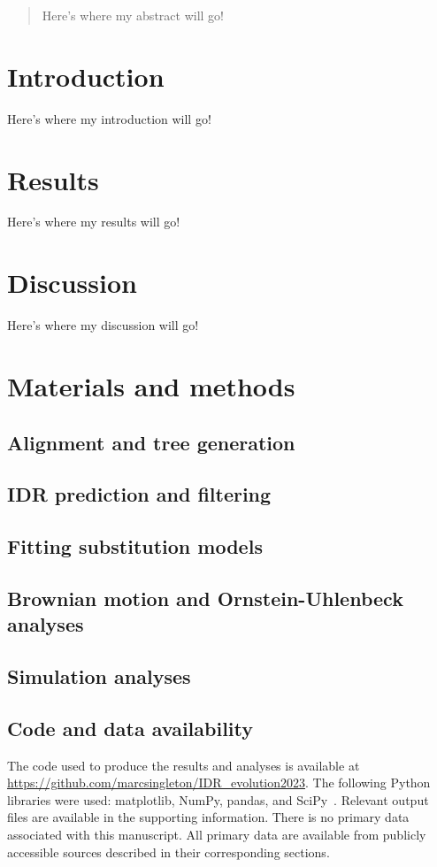 \begin{abstract}
\noindent
Here's where my abstract will go!
\end{abstract}

\section{Introduction}
Here's where my introduction will go!

\section{Results}
Here's where my results will go!

\section{Discussion}
Here's where my discussion will go!

\section{Materials and methods}

\subsection{Alignment and tree generation}

\subsection{IDR prediction and filtering}

\subsection{Fitting substitution models}

\subsection{Brownian motion and Ornstein-Uhlenbeck analyses}

\subsection{Simulation analyses}

\subsection{Code and data availability}
The code used to produce the results and analyses is available at \url{https://github.com/marcsingleton/IDR_evolution2023}. The following Python libraries were used: matplotlib, NumPy, pandas, and SciPy~\cite{Hunter2007, Harris2020, McKinney2010, Virtanen2020}. Relevant output files are available in the supporting information. There is no primary data associated with this manuscript. All primary data are available from publicly accessible sources described in their corresponding sections.
